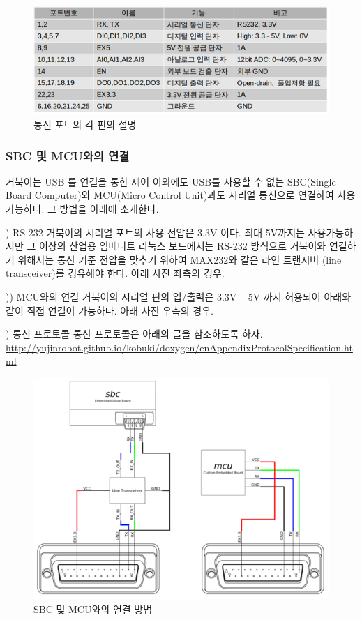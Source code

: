\begin{figure}[h]
\centering\includegraphics[width=0.8\columnwidth]{pictures/chapter10/kobuki_dsub25_num.png}
\caption{통신 포트의 각 핀의 설명}
\end{figure}

\subsubsection{SBC 및 MCU와의 연결}

거북이는 USB 를 연결을 통한 제어 이외에도 USB를 사용할 수 없는 SBC(Single Board Computer)와 MCU(Micro Control Unit)과도 시리얼 통신으로 연결하여 사용 가능하다. 그 방법을 아래에 소개한다.

\setcounter{num}{0}

\vspace{\baselineskip}
\noindent
{}
\thenum) RS-232
거북이의 시리얼 포트의 사용 전압은 3.3V 이다. 최대 5V까지는 사용가능하지만 그 이상의 산업용 임베디트 리눅스 보드에서는 RS-232 방식으로 거북이와 연결하기 위해서는 통신 기준 전압을 맞추기 위하여 MAX232와 같은 라인 트랜시버 (line transceiver)를 경유해야 한다. 아래 사진 좌측의 경우.

\noindent
{}
\thenum)) MCU와의 연결
거북이의 시리얼 핀의 입/출력은 3.3V ~ 5V 까지 허용되어 아래와 같이 직접 연결이 가능하다. 아래 사진 우측의 경우.

\noindent
{}
\thenum) 통신 프로토콜
통신 프로토콜은 아래의 글을 참조하도록 하자.
\url{http://yujinrobot.github.io/kobuki/doxygen/enAppendixProtocolSpecification.html}

\begin{figure}[h]
\centering\includegraphics[width=0.9\columnwidth]{pictures/chapter10/kobuki_connect.png}
\caption{SBC 및 MCU와의 연결 방법}
\end{figure}

